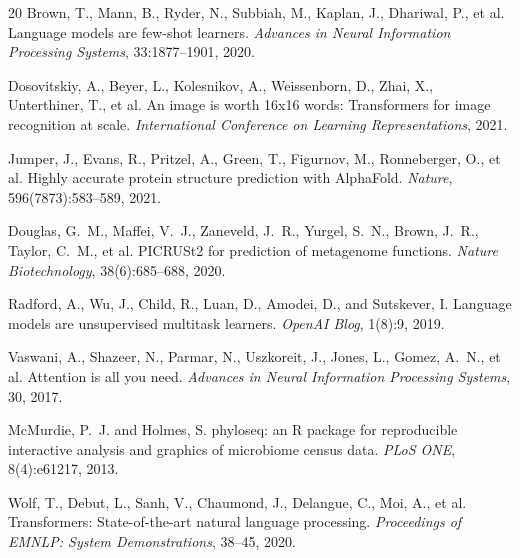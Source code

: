 \documentclass[11pt,a4paper]{article}
\begin{document}
\begin{thebibliography}{20}
Brown, T., Mann, B., Ryder, N., Subbiah, M., Kaplan, J., Dhariwal, P., et al.
\newblock Language models are few-shot learners.
\newblock \emph{Advances in Neural Information Processing Systems}, 33:1877--1901, 2020.

Dosovitskiy, A., Beyer, L., Kolesnikov, A., Weissenborn, D., Zhai, X., Unterthiner, T., et al.
\newblock An image is worth 16x16 words: Transformers for image recognition at scale.
\newblock \emph{International Conference on Learning Representations}, 2021.

Jumper, J., Evans, R., Pritzel, A., Green, T., Figurnov, M., Ronneberger, O., et al.
\newblock Highly accurate protein structure prediction with AlphaFold.
\newblock \emph{Nature}, 596(7873):583--589, 2021.

Douglas, G.~M., Maffei, V.~J., Zaneveld, J.~R., Yurgel, S.~N., Brown, J.~R., Taylor, C.~M., et al.
\newblock PICRUSt2 for prediction of metagenome functions.
\newblock \emph{Nature Biotechnology}, 38(6):685--688, 2020.

Radford, A., Wu, J., Child, R., Luan, D., Amodei, D., and Sutskever, I.
\newblock Language models are unsupervised multitask learners.
\newblock \emph{OpenAI Blog}, 1(8):9, 2019.

Vaswani, A., Shazeer, N., Parmar, N., Uszkoreit, J., Jones, L., Gomez, A.~N., et al.
\newblock Attention is all you need.
\newblock \emph{Advances in Neural Information Processing Systems}, 30, 2017.

McMurdie, P.~J. and Holmes, S.
\newblock phyloseq: an R package for reproducible interactive analysis and graphics of microbiome census data.
\newblock \emph{PLoS ONE}, 8(4):e61217, 2013.

Wolf, T., Debut, L., Sanh, V., Chaumond, J., Delangue, C., Moi, A., et al.
\newblock Transformers: State-of-the-art natural language processing.
\newblock \emph{Proceedings of EMNLP: System Demonstrations}, 38--45, 2020.

\end{thebibliography}
\end{document}
